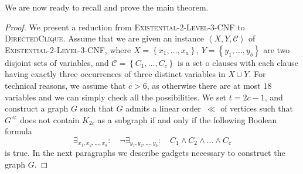 \documentclass[a4paper,USenglish,cleveref,autoref,thm-restate,pdfa]{lipics-v2021}
\newcommand{\Pdirclique}{\textsc{DirectedClique}\xspace}
\newcommand{\PSPTWO}{\textsc{Existential-}2\textsc{-Level-}3{-CNF}\xspace}
\newcommand{\abrac}[1]{\left\langle#1\right\rangle}
\newcommand{\set}[1]{\left\{#1\right\}}
\begin{document}
We are now ready to recall and prove the main theorem.
\thmmain*
\begin{proof}
    We present a reduction from \PSPTWO to \Pdirclique.
    Assume that we are given an instance $\abrac{X,Y,\mathcal{C}}$ of \PSPTWO, where $X=\set{x_1,\ldots,x_a}$, $Y=\set{y_1,\ldots,y_b}$ are two disjoint sets of variables, and $\mathcal{C}=\set{C_1,\ldots,C_c}$ is a set o clauses with each clause having exactly three occurrences of three distinct variables in $X \cup Y$.
    For technical reasons, we assume that $c>6$, as otherwise there are at most $18$ variables and we can simply check all the possibilities.
    We set $t=2c-1$, and construct a graph $G$ such that $G$ admits a linear order~$\ll$ of vertices such that $G^\ll$ does not contain $K_{2c}$ as a subgraph if and only if the following Boolean formula
    \[
        \exists_{x_1,x_2,\ldots,x_a}:\quad \neg \exists_{y_1,y_2,\ldots,y_b}:\quad C_1 \wedge C_2 \wedge \ldots\wedge C_c
    \]
    is true.
    In the next paragraphs we describe gadgets necessary to construct the graph $G$.


\end{proof}
\end{document}
